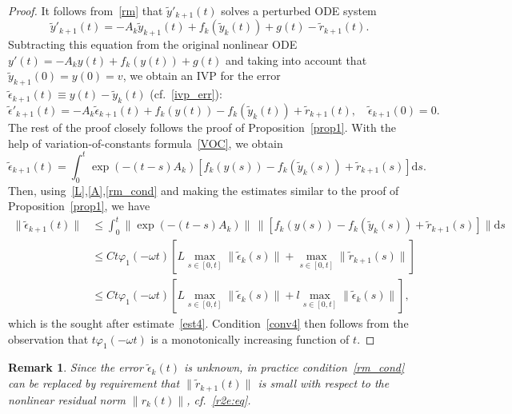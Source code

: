 \documentclass[sn-aps]{sn-jnl}
\theoremstyle{thmstyleone}%
\theoremstyle{thmstyletwo}%
\newtheorem{remark}{Remark}%
\theoremstyle{thmstylethree}%
\newcommand{\dd}{\mathrm{d}}
\newcommand{\leqs}{\leqslant}
\begin{document}
\begin{proof}
It follows from~\eqref{rm} that $\tilde{y}'_{k+1}(t)$ solves a perturbed ODE 
system
$$
\tilde{y}'_{k+1}(t)= -A_k\tilde{y}_{k+1}(t)+ f_k(\tilde{y}_k(t))  + g(t) 
- \tilde{r}_{k+1}(t). 
$$
Subtracting this equation from the original nonlinear ODE
$y'(t)= -A_k y(t)+ f_k(y(t)) + g(t)$ 
and taking into account that $\tilde{y}_{k+1}(0)=y(0)=v$,
we obtain an IVP for the error
$\tilde{\epsilon}_{k+1}(t)\equiv y(t) - \tilde{y}_{k}(t)$ (cf.~\eqref{ivp_err}):
$$
\tilde{\epsilon}'_{k+1}(t) = -A_k \tilde{\epsilon}_{k+1}(t) + f_k(y(t)) -
f_k(\tilde{y}_k(t)) + \tilde{r}_{k+1}(t),
\quad \tilde{\epsilon}_{k+1}(0)=0.
$$
The rest of the proof closely follows the proof of Proposition~\ref{prop1}. 
With the help of variation-of-constants formula~\eqref{VOC}, we obtain
$$
\tilde{\epsilon}_{k+1}(t) = \int_0^t \exp(-(t-s)A_k)\left[f_k(y(s))-f_k(\tilde{y}_k(s))
  + \tilde{r}_{k+1}(s)\right]\dd s.
$$
Then, using~\eqref{L},\eqref{A},\eqref{rm_cond} and making the estimates similar to the proof of
Proposition~\ref{prop1}, we have
$$
\begin{aligned}
\|\tilde{\epsilon}_{k+1}(t)\| 
&\leqs 
\int_0^t \| \exp(-(t-s)A_k)\|\,\|\left[f_k(y(s))-f_k(\tilde{y}_k(s)) + \tilde{r}_{k+1}(s)\right]\|\dd s
\\
&\leqs C t \varphi_1(-\omega t) \left[ L \max_{s\in[0,t]}\|\tilde{\epsilon}_k(s)\|
+ \max_{s\in[0,t]}\|\tilde{r}_{k+1}(s)\|\right]
\\
&\leqs C t \varphi_1(-\omega t) \left[ L \max_{s\in[0,t]}\|\tilde{\epsilon}_k(s)\|
+ l \max_{s\in[0,t]}\|\tilde{\epsilon}_k(s)\|\right],
\end{aligned}
$$
which is the sought after estimate~\eqref{est4}.
Condition~\eqref{conv4} then follows from the observation that 
$t \varphi_1(-\omega t)$ is a monotonically increasing function of $t$.
\end{proof}

\begin{remark}
Since the error $\tilde{\epsilon}_k(t)$ is unknown,  in practice condition~\eqref{rm_cond}
can be replaced by requirement that $\|\tilde{r}_{k+1}(t)\|$ is small with respect
to the nonlinear residual norm $\|r_k(t)\|$, cf.~\eqref{r2e:eq}.
\end{remark}
\end{document}
